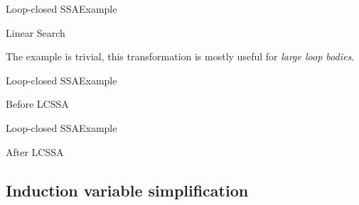 \begin{frame}{Loop-closed SSA}{Example}
\begin{block}{Linear Search}
\centering
{}
\end{block}

\vfill
\begin{center}
The example is trivial, this transformation is mostly useful for \emph{large loop bodies}.
\end{center}
\end{frame}


\begin{frame}{Loop-closed SSA}{Example}
\begin{block}{Before LCSSA}
\centering
{}
\end{block}
\vspace{\baselineskip}
\vfill
\end{frame}


\begin{frame}{Loop-closed SSA}{Example}
\begin{block}{After LCSSA}
\centering
{}
\end{block}
\vfill
\end{frame}


\subsection{Induction variable simplification}


